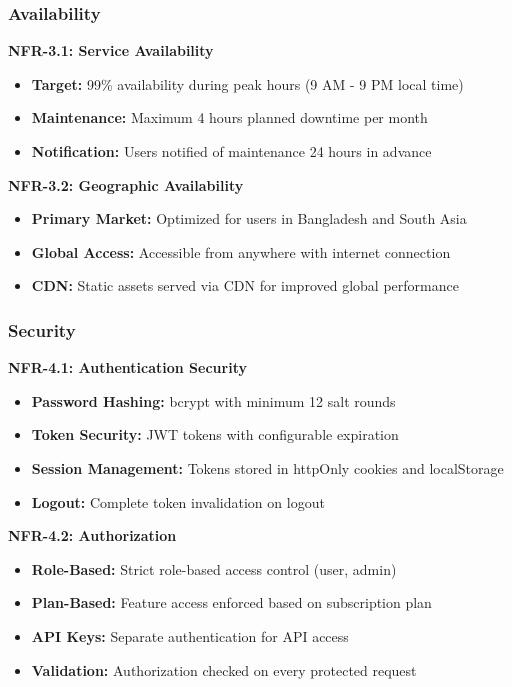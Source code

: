 \documentclass[12pt,a4paper]{article}
\begin{document}
\subsubsection{Availability}

\textbf{NFR-3.1: Service Availability}
\begin{itemize}
    \item \textbf{Target:} 99\% availability during peak hours (9 AM - 9 PM local time)
    \item \textbf{Maintenance:} Maximum 4 hours planned downtime per month
    \item \textbf{Notification:} Users notified of maintenance 24 hours in advance
\end{itemize}

\textbf{NFR-3.2: Geographic Availability}
\begin{itemize}
    \item \textbf{Primary Market:} Optimized for users in Bangladesh and South Asia
    \item \textbf{Global Access:} Accessible from anywhere with internet connection
    \item \textbf{CDN:} Static assets served via CDN for improved global performance
\end{itemize}

\subsubsection{Security}

\textbf{NFR-4.1: Authentication Security}
\begin{itemize}
    \item \textbf{Password Hashing:} bcrypt with minimum 12 salt rounds
    \item \textbf{Token Security:} JWT tokens with configurable expiration
    \item \textbf{Session Management:} Tokens stored in httpOnly cookies and localStorage
    \item \textbf{Logout:} Complete token invalidation on logout
\end{itemize}

\textbf{NFR-4.2: Authorization}
\begin{itemize}
    \item \textbf{Role-Based:} Strict role-based access control (user, admin)
    \item \textbf{Plan-Based:} Feature access enforced based on subscription plan
    \item \textbf{API Keys:} Separate authentication for API access
    \item \textbf{Validation:} Authorization checked on every protected request
\end{itemize}
\end{document}
